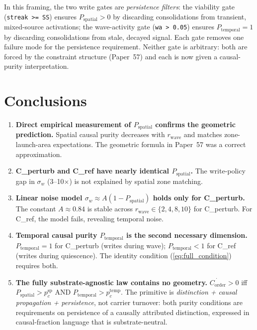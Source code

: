\documentclass[11pt,a4paper]{article}
\newcommand{\Corder}{C_{\mathrm{order}}}
\newcommand{\Psp}{P_{\mathrm{spatial}}}
\newcommand{\Ptemp}{P_{\mathrm{temporal}}}
\begin{document}
In this framing, the two write gates are \emph{persistence filters}:
the viability gate (\texttt{streak >= SS}) ensures $\Psp > 0$ by
discarding consolidations from transient, mixed-source activations;
the wave-activity gate (\texttt{wa > 0.05}) ensures $\Ptemp = 1$ by
discarding consolidations from stale, decayed signal.
Each gate removes one failure mode for the persistence requirement.
Neither gate is arbitrary: both are forced by the constraint structure (Paper~57)
and each is now given a causal-purity interpretation.

\section{Conclusions}

\begin{enumerate}
  \item \textbf{Direct empirical measurement of $\Psp$ confirms the geometric prediction.}
    Spatial causal purity decreases with $r_\mathrm{wave}$ and matches zone-launch-area
    expectations. The geometric formula in Paper~57 was a correct approximation.

  \item \textbf{C\_perturb and C\_ref have nearly identical $\Psp$.}
    The write-policy gap in $\sigma_w$ (3--10$\times$) is not explained by spatial zone matching.

  \item \textbf{Linear noise model $\sigma_w \approx A(1-\Psp)$ holds only for C\_perturb.}
    The constant $A \approx 0.84$ is stable across $r_\mathrm{wave} \in \{2,4,8,10\}$ for
    C\_perturb. For C\_ref, the model fails, revealing temporal noise.

  \item \textbf{Temporal causal purity $\Ptemp$ is the second necessary dimension.}
    $\Ptemp = 1$ for C\_perturb (writes during wave); $\Ptemp < 1$ for C\_ref (writes during
    quiescence). The identity condition (\ref{eq:full_condition}) requires both.

  \item \textbf{The fully substrate-agnostic law contains no geometry.}
    $\dot{\Corder} > 0$ iff $\Psp > p_c^\mathrm{sp}$ AND $\Ptemp > p_c^\mathrm{temp}$.
    The primitive is \emph{distinction + causal propagation + persistence}, not carrier
    turnover: both purity conditions are requirements on persistence of a causally
    attributed distinction, expressed in causal-fraction language that is substrate-neutral.
\end{enumerate}
\end{document}
